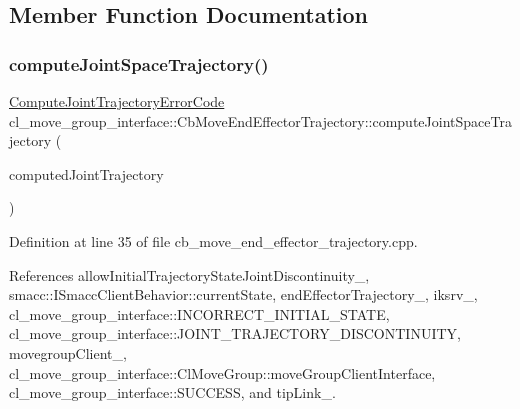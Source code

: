 \subsection{Member Function Documentation}
\mbox{\label{classcl__move__group__interface_1_1CbMoveEndEffectorTrajectory_a485057c052729edd3e8303440b7ada66}} 
\subsubsection{\texorpdfstring{compute\+Joint\+Space\+Trajectory()}{computeJointSpaceTrajectory()}}
{\footnotesize\ttfamily \hyperlink{namespacecl__move__group__interface_ae5fc1caf9a16ae5ad1c97c2e137a7017}{Compute\+Joint\+Trajectory\+Error\+Code} cl\+\_\+move\+\_\+group\+\_\+interface\+::\+Cb\+Move\+End\+Effector\+Trajectory\+::compute\+Joint\+Space\+Trajectory (\begin{DoxyParamCaption}\item[{moveit\+\_\+msgs\+::\+Robot\+Trajectory \&}]{computed\+Joint\+Trajectory }\end{DoxyParamCaption})\hspace{0.3cm}{\ttfamily [protected]}}



Definition at line 35 of file cb\+\_\+move\+\_\+end\+\_\+effector\+\_\+trajectory.\+cpp.



References allow\+Initial\+Trajectory\+State\+Joint\+Discontinuity\+\_\+, smacc\+::\+I\+Smacc\+Client\+Behavior\+::current\+State, end\+Effector\+Trajectory\+\_\+, iksrv\+\_\+, cl\+\_\+move\+\_\+group\+\_\+interface\+::\+I\+N\+C\+O\+R\+R\+E\+C\+T\+\_\+\+I\+N\+I\+T\+I\+A\+L\+\_\+\+S\+T\+A\+TE, cl\+\_\+move\+\_\+group\+\_\+interface\+::\+J\+O\+I\+N\+T\+\_\+\+T\+R\+A\+J\+E\+C\+T\+O\+R\+Y\+\_\+\+D\+I\+S\+C\+O\+N\+T\+I\+N\+U\+I\+TY, movegroup\+Client\+\_\+, cl\+\_\+move\+\_\+group\+\_\+interface\+::\+Cl\+Move\+Group\+::move\+Group\+Client\+Interface, cl\+\_\+move\+\_\+group\+\_\+interface\+::\+S\+U\+C\+C\+E\+SS, and tip\+Link\+\_\+.



